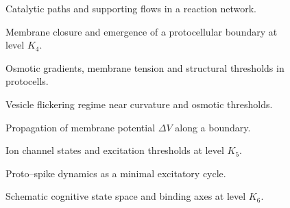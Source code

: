 \begin{figure}[p]
  \centering
  
  \caption{Catalytic paths and supporting flows in a reaction network.}
  \label{fig:catalytic-paths}
\end{figure}

\begin{figure}[p]
  \centering
  
  \caption{Membrane closure and emergence of a protocellular boundary
           at level \texorpdfstring{\(K_4\)}{K_4}.}
  \label{fig:membrane-closure}
\end{figure}

\begin{figure}[p]
  \centering
  
  \caption{Osmotic gradients, membrane tension and structural thresholds
           in protocells.}
  \label{fig:gradient-osmosis-tension}
\end{figure}

\begin{figure}[p]
  \centering
  
  \caption{Vesicle flickering regime near curvature and osmotic thresholds.}
  \label{fig:vesicle-flickering}
\end{figure}

\begin{figure}[p]
  \centering
  
  \caption{Propagation of membrane potential \texorpdfstring{\(\Delta V\)}{\Delta V} along a boundary.}
  \label{fig:dv-propagation-membrane}
\end{figure}

\begin{figure}[p]
  \centering
  
  \caption{Ion channel states and excitation thresholds at level \texorpdfstring{\(K_5\)}{K_5}.}
  \label{fig:ion-channel-states}
\end{figure}

\begin{figure}[p]
  \centering
  
  \caption{Proto--spike dynamics as a minimal excitatory cycle.}
  \label{fig:proto-spike}
\end{figure}

\begin{figure}[p]
  \centering
  
  \caption{Schematic cognitive state space and binding axes at level \texorpdfstring{\(K_6\)}{K_6}.}
  \label{fig:cognitive-state-space}
\end{figure}

